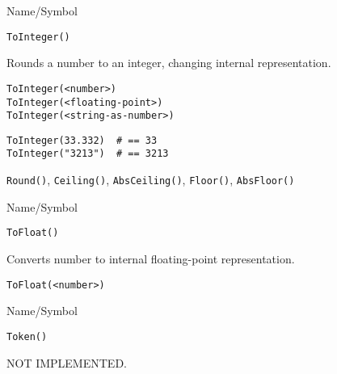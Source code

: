 \begin{desc}{Name/Symbol}
\item[Name/Symbol]  	\verb+ToInteger()+
              
\item[Description]  	Rounds a number to an integer, changing internal 
		representation.

\item[Usage]
\begin{verbatim}
ToInteger(<number>)
ToInteger(<floating-point>)
ToInteger(<string-as-number>)
\end{verbatim}

\item[Example]
\begin{verbatim}
ToInteger(33.332)  # == 33
ToInteger("3213")  # == 3213
\end{verbatim}

\item[See Also]    	\verb+Round()+, \verb+Ceiling()+, \verb+AbsCeiling()+, \verb+Floor()+, \verb+AbsFloor()+
\end{desc}

\rl


\begin{desc}{Name/Symbol}
\item[Name/Symbol]  	\verb+ToFloat()+

\item[Description] 	Converts number to internal floating-point representation.

\item[Usage]
\begin{verbatim}
ToFloat(<number>)
\end{verbatim}

\item[Example]	

\item[See Also]	
\end{desc}

\rl


\begin{desc}{Name/Symbol}
\item[Name/Symbol]  	\verb+Token()+

\item[Description]  	NOT IMPLEMENTED.

\item[Usage]		

\item[Example]	

\item[See Also]	
\end{desc}

